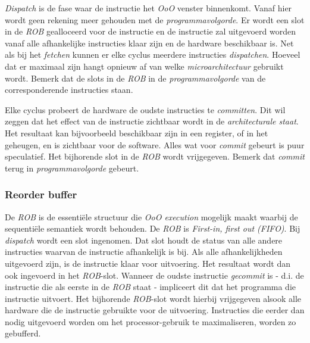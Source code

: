 \documentclass[12pt,a4paper,faculty=ea,language=nl]{ugent-doc}
\begin{document}
\textit{Dispatch} is de fase waar de instructie het \textit{OoO} venster binnenkomt. Vanaf hier wordt geen rekening meer gehouden met de \textit{programmavolgorde}. Er wordt een slot in de \textit{ROB} gealloceerd voor de instructie en de instructie zal uitgevoerd worden vanaf alle afhankelijke instructies klaar zijn en de hardware beschikbaar is. Net als bij het \textit{fetchen} kunnen er elke cyclus meerdere instructies \textit{dispatchen}. Hoeveel dat er maximaal zijn hangt opnieuw af van welke \textit{microarchitectuur} gebruikt wordt. Bemerk dat de slots in de \textit{ROB} in de \textit{programmavolgorde} van de corresponderende instructies staan.

Elke cyclus probeert de hardware de oudste instructies te \textit{committen}. Dit wil zeggen dat het effect van de instructie zichtbaar wordt in de \textit{architecturale staat}. Het resultaat kan bijvoorbeeld beschikbaar zijn in een register, of in het geheugen, en is zichtbaar voor de software. Alles wat voor \textit{commit} gebeurt is puur speculatief. Het bijhorende slot in de \textit{ROB} wordt vrijgegeven. Bemerk dat \textit{commit} terug in \textit{programmavolgorde} gebeurt.


\subsubsection{Reorder buffer}
De \textit{ROB} is de essentiële structuur die \textit{OoO execution} mogelijk maakt waarbij de sequentiële semantiek wordt behouden. De \textit{ROB} is \textit{First-in, first out (FIFO)}. Bij \textit{dispatch} wordt een slot ingenomen. Dat slot houdt de status van alle andere instructies waarvan de instructie afhankelijk is bij. Als alle afhankelijkheden uitgevoerd zijn, is de instructie klaar voor uitvoering. Het resultaat wordt dan ook ingevoerd in het \textit{ROB}-slot. Wanneer de oudste instructie \textit{gecommit} is - d.i. de instructie die als eerste in de \textit{ROB} staat - impliceert dit dat het programma die instructie uitvoert. Het bijhorende \textit{ROB}-slot wordt hierbij vrijgegeven alsook alle hardware die de instructie gebruikte voor de uitvoering. Instructies die eerder dan nodig uitgevoerd worden om het processor-gebruik te maximaliseren, worden zo gebufferd.
\end{document}
